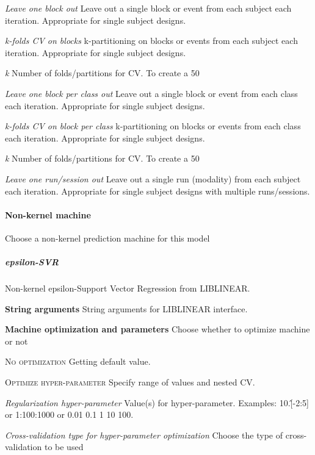 \textit{Leave one block out}
Leave out a single block or event from each subject each iteration. Appropriate for single subject designs.


\textit{k-folds CV on blocks}
k-partitioning on blocks or events from each subject each iteration. Appropriate for single subject designs.


\textit{k}
Number of folds/partitions for CV. To create a 50%


\textit{Leave one block per class out}
Leave out a single block or event from each class each iteration. Appropriate for single subject designs.


\textit{k-folds CV on block per class}
k-partitioning on blocks or events from each class each iteration. Appropriate for single subject designs.


\textit{k}
Number of folds/partitions for CV. To create a 50%


\textit{Leave one run/session out}
Leave out a single run (modality) from each subject each iteration. Appropriate for single subject designs with multiple runs/sessions.


\paragraph{Non-kernel machine}
Choose a non-kernel prediction machine for this model


\subparagraph{epsilon-SVR}
Non-kernel epsilon-Support Vector Regression from LIBLINEAR.


\textbf{String arguments}
String arguments for LIBLINEAR interface.


\textbf{Machine optimization and parameters}
Choose whether to optimize machine or not


\textsc{No optimization}
Getting default value.


\textsc{Optimize hyper-parameter}
Specify range of values and nested CV.


\textsl{Regularization hyper-parameter}
Value(s) for hyper-parameter. Examples: 10.\^[-2:5] or 1:100:1000 or 0.01 0.1 1 10 100.


\textsl{Cross-validation type for hyper-parameter optimization}
Choose the type of cross-validation to be used


